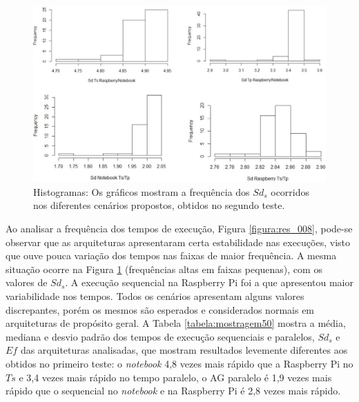 \begin{figure}[htb]  
	\centering
	\includegraphics[width=.95\textwidth]{figuras/res_009_50sd}
	\caption[Histogramas dos $Sd_s$ obtidos]{Histogramas: Os gráficos mostram a frequência dos $Sd_s$ ocorridos nos diferentes cenários propostos, obtidos no segundo teste.}
	\label{figura:res_009}
\end{figure} 

Ao analisar a frequência dos tempos de execução, Figura \ref{figura:res_008}, pode-se observar que as arquiteturas apresentaram certa estabilidade nas execuções, visto que ouve pouca variação dos tempos nas faixas de maior frequência. A mesma situação ocorre na Figura \ref{figura:res_009} (frequências altas em faixas pequenas), com os valores de $Sd_s$. A execução sequencial na Raspberry Pi foi a que apresentou maior variabilidade nos tempos. Todos os cenários apresentam alguns valores discrepantes, porém os mesmos são esperados e considerados normais em arquiteturas de propósito geral. A Tabela \ref{tabela:mostragem50} mostra a média, mediana e desvio padrão dos tempos de execução sequenciais e paralelos, $Sd_s$ e $Ef$ das arquiteturas analisadas, que mostram resultados levemente diferentes aos obtidos no primeiro teste: o \textit{notebook} 4,8 vezes mais rápido que a Raspberry Pi no $Ts$ e 3,4 vezes mais rápido no tempo paralelo, o AG paralelo é 1,9 vezes mais rápido que o sequencial no \textit{notebook} e na Raspberry Pi é 2,8 vezes mais rápido.

